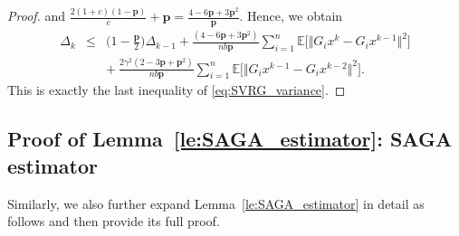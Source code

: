 \documentclass{article}
\newcommand{\norms}[1]{\Vert#1\Vert}
\newcommand{\Expk}[1]{\mathbb{E}\big[#1\big]}
\newcommand{\mbf}[1]{\mathbf{#1}}
\newcommand{\beforesubsec}{\vspace{-1.5ex}}
\newcommand{\aftersubsec}{\vspace{-1.5ex}}
\theoremstyle{plain}
\theoremstyle{definition}
\theoremstyle{remark}
\begin{document}
\begin{proof}
and $\frac{2(1+c)(1 - \mbf{p} )}{c} + \mbf{p}  = \frac{4 - 6 \mbf{p} + 3 \mbf{p}^2}{ \mbf{p} }$. %
Hence, we obtain 
\begin{equation*}
\begin{array}{lcl}
\Delta_k  & \leq &  \big(1 -  \frac{\mbf{p}}{2} \big)  \Delta_{k-1}  +   \frac{(4 - 6\mbf{p} + 3\mbf{p}^2 )}{ nb  \mbf{p} } \sum_{i=1}^n \Expk{ \norms{G_ix^k - G_ix^{k-1}}^2 } \\
&& + {~}  \frac{2 \gamma^2(2 - 3\mbf{p} + \mbf{p}^2 ) }{ nb \mbf{p}  } \sum_{i=1}^n \Expk{ \norms{G_ix^{k-1} - G_ix^{k-2} }^2 }.
\end{array}
\end{equation*}
This is exactly the last inequality of  \eqref{eq:SVRG_variance}.
\end{proof}

\beforesubsec
\subsection{Proof of Lemma~\ref{le:SAGA_estimator}: SAGA estimator}\label{subsec:le:SAGA_estimator}
\aftersubsec
Similarly, we also further expand Lemma~\ref{le:SAGA_estimator} in detail as follows and then provide its full proof.
\end{document}
